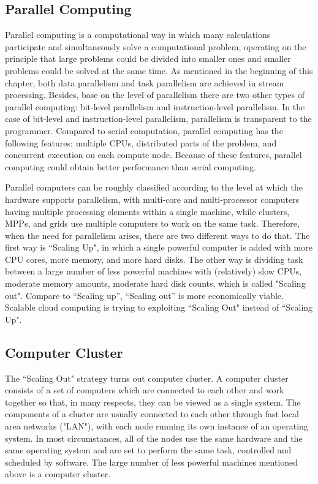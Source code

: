 \subsection{Parallel Computing}
\label{subsection:parallel_computing}
Parallel computing is a computational way in which many calculations participate and simultaneously solve a computational problem, operating on the principle that large problems could be divided into smaller ones and smaller problems could be solved at the same time. As mentioned in the beginning of this chapter, both data parallelism and task parallelism are achieved in stream processing. Besides, base on the level of parallelism there are two other types of parallel computing: bit-level parallelism and instruction-level parallelism. In the case of bit-level and instruction-level parallelism, parallelism is transparent to the programmer. Compared to serial computation, parallel computing has the following features: multiple CPUs, distributed parts of the problem, and concurrent execution on each compute node. Because of these features, parallel computing could obtain better performance than serial computing. 

Parallel computers can be roughly classified according to the level at which the hardware supports parallelism, with multi-core and multi-processor computers having multiple processing elements within a single machine, while clusters, MPPs, and grids use multiple computers to work on the same task. Therefore, when the need for parallelism arises, there are two different ways to do that. The first way is ``Scaling Up", in which a single powerful computer is added with more CPU cores, more memory, and more hard disks. The other way is dividing task between a large number of less powerful machines with (relatively) slow CPUs, moderate memory amounts, moderate hard disk counts, which is called "Scaling out". Compare to ``Scaling up'', ``Scaling out'' is more economically viable. Scalable cloud computing is trying to exploiting ``Scaling Out" instead of ``Scaling Up".

\subsection{Computer Cluster}
\label{subsection:computing_cluster}
The ``Scaling Out" strategy turns out computer cluster. A computer cluster consists of a set of computers which are connected to each other and work together so that, in many respects, they can be viewed as a single system. The components of a cluster are usually connected to each other through fast local area networks ("LAN"), with each node running its own instance of an operating system. In most circumstances, all of the nodes use the same hardware and the same operating system and are set to perform the same task, controlled and scheduled by software. The large number of less powerful machines mentioned above is a computer cluster.

